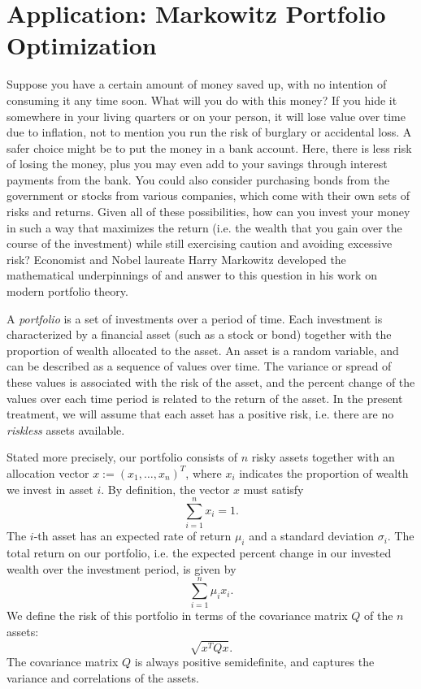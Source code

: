 \section*{Application: Markowitz Portfolio Optimization}
Suppose you have a certain amount of money saved up, with no intention of consuming it any time soon.
What will you do with this money? If you hide it somewhere in your living quarters or on your person,
it will lose value over time due to inflation, not to mention you run the risk of burglary or accidental
loss. A safer choice might be to put the money in a bank account. Here, there is less risk of losing the
money, plus you may even add to your savings through interest payments from the bank. You could also
consider purchasing bonds from the government or stocks from various companies, which come with their own
sets of risks and returns. Given all of these possibilities, how can you invest your money in such a way
that maximizes the return (i.e. the wealth that you gain over the course of the investment) while still
exercising caution and avoiding excessive risk? Economist and Nobel laureate Harry Markowitz developed
the mathematical underpinnings of and answer to this question in his work on modern portfolio theory.

A \emph{portfolio} is a set of investments over a period of time. Each
investment is characterized by a financial asset (such as a stock or bond) together with the proportion of
wealth allocated to the asset. An asset is a random variable, and can be described as a sequence of values over time.
The variance or spread of these values is associated with the risk of the asset, and the percent change of the values
over each time period is related to the return of the asset.
In the present treatment, we will assume that each asset has a positive risk, i.e.
there are no \emph{riskless} assets available.

Stated more precisely, our portfolio consists of $n$ risky assets together with an allocation vector
$x := (x_1,\ldots,x_n)^T$, where $x_i$ indicates the proportion of wealth we invest in
asset $i$. By definition, the vector $x$ must satisfy
\[
\sum_{i=1}^n x_i = 1.
\]
The $i$-th asset has an expected rate of return $\mu_i$ and a standard deviation $\sigma_i$.
The total return on our portfolio, i.e. the expected percent change in our invested wealth over the investment period,
is given by
\[
\sum_{i=1}^n \mu_ix_i.
\]
We define the risk of this portfolio in terms of the covariance matrix $Q$ of the $n$ assets:
\[
\sqrt{x^T Q x}.
\]
The covariance matrix $Q$ is always positive semidefinite, and captures the variance and correlations of the assets.

